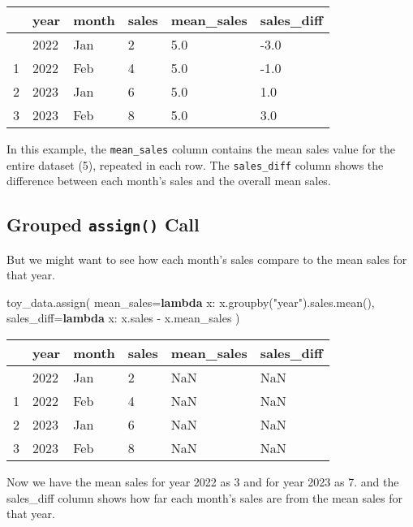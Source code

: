 \documentclass[
  letterpaper,
  DIV=11,
  numbers=noendperiod]{scrreprt}
\newenvironment{Shaded}{\begin{snugshade}}{\end{snugshade}}
\newcommand{\KeywordTok}[1]{\textcolor[rgb]{0.00,0.23,0.31}{\textbf{#1}}}
\newcommand{\NormalTok}[1]{\textcolor[rgb]{0.00,0.23,0.31}{#1}}
\newcommand{\OperatorTok}[1]{\textcolor[rgb]{0.37,0.37,0.37}{#1}}
\newcommand{\StringTok}[1]{\textcolor[rgb]{0.13,0.47,0.30}{#1}}
\begin{document}
\begin{longtable}[]{@{}llllll@{}}
\toprule\noalign{}
& year & month & sales & mean\_sales & sales\_diff \\
\midrule\noalign{}
\endhead
\bottomrule\noalign{}
\endlastfoot
0 & 2022 & Jan & 2 & 5.0 & -3.0 \\
1 & 2022 & Feb & 4 & 5.0 & -1.0 \\
2 & 2023 & Jan & 6 & 5.0 & 1.0 \\
3 & 2023 & Feb & 8 & 5.0 & 3.0 \\
\end{longtable}

In this example, the \texttt{mean\_sales} column contains the mean sales
value for the entire dataset (5), repeated in each row. The
\texttt{sales\_diff} column shows the difference between each month's
sales and the overall mean sales.

\subsection{\texorpdfstring{Grouped \texttt{assign()}
Call}{Grouped assign() Call}}\label{grouped-assign-call}

But we might want to see how each month's sales compare to the mean
sales for that year.

\begin{Shaded}
\begin{Highlighting}[]
\NormalTok{toy\_data.assign(}
\NormalTok{    mean\_sales}\OperatorTok{=}\KeywordTok{lambda}\NormalTok{ x: x.groupby(}\StringTok{"year"}\NormalTok{).sales.mean(),}
\NormalTok{    sales\_diff}\OperatorTok{=}\KeywordTok{lambda}\NormalTok{ x: x.sales }\OperatorTok{{-}}\NormalTok{ x.mean\_sales}
\NormalTok{)}
\end{Highlighting}
\end{Shaded}

\begin{longtable}[]{@{}llllll@{}}
\toprule\noalign{}
& year & month & sales & mean\_sales & sales\_diff \\
\midrule\noalign{}
\endhead
\bottomrule\noalign{}
\endlastfoot
0 & 2022 & Jan & 2 & NaN & NaN \\
1 & 2022 & Feb & 4 & NaN & NaN \\
2 & 2023 & Jan & 6 & NaN & NaN \\
3 & 2023 & Feb & 8 & NaN & NaN \\
\end{longtable}

Now we have the mean sales for year 2022 as 3 and for year 2023 as 7.
and the sales\_diff column shows how far each month's sales are from the
mean sales for that year.
\end{document}
